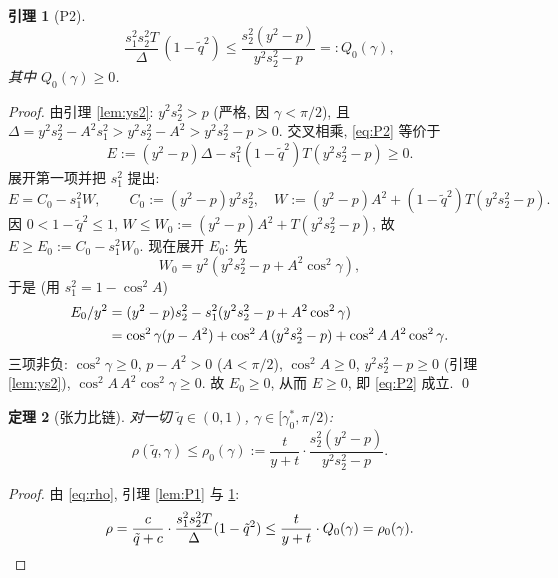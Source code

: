 \documentclass[UTF8]{ctexart}
\newtheorem{theorem}{定理}[section]
\newtheorem{lemma}[theorem]{引理}
\begin{document}
\begin{lemma}[P2]\label{lem:P2}
\begin{equation}
	\frac{s_1^2s_2^2T}{\Delta}\,(1-\tilde q^2)\le
	\frac{s_2^2(y^2-p)}{y^2s_2^2-p}=:Q_0(\gamma),
	\label{eq:P2}
\end{equation}
其中 $Q_0(\gamma)\ge0$.
\end{lemma}

\begin{proof}
由引理 \ref{lem:ys2}: $y^2s_2^2>p$ (严格, 因 $\gamma<\pi/2$), 且
$\Delta=y^2s_2^2-A^2s_1^2>y^2s_2^2-A^2>y^2s_2^2-p>0$. 交叉相乘, \eqref{eq:P2}
等价于
\begin{equation}
	E:=(y^2-p)\Delta-s_1^2(1-\tilde q^2)T(y^2s_2^2-p)\ge0.
	\label{eq:E}
\end{equation}
展开第一项并把 $s_1^2$ 提出:
\begin{equation}
	E=C_0-s_1^2W,
	\qquad
	C_0:=(y^2-p)y^2s_2^2,\quad
	W:=(y^2-p)A^2+(1-\tilde q^2)T(y^2s_2^2-p).
\end{equation}
因 $0<1-\tilde q^2\le1$, $W\le W_0:=(y^2-p)A^2+T(y^2s_2^2-p)$, 故
$E\ge E_0:=C_0-s_1^2W_0$. 现在展开 $E_0$: 先
\begin{equation*}
	W_0=y^2(y^2s_2^2-p+A^2\cos^2\gamma),
\end{equation*}
于是 (用 $s_1^2=1-\cos^2A$)
\begin{align}
	E_0/y^2&=(y^2-p)s_2^2-s_1^2(y^2s_2^2-p+A^2\cos^2\gamma)
	\notag\\
	&=\cos^2\gamma(p-A^2)+\cos^2A\,(y^2s_2^2-p)
	+\cos^2A\,A^2\cos^2\gamma.
	\label{eq:E0}
\end{align}
三项非负: $\cos^2\gamma\ge0$, $p-A^2>0$ ($A<\pi/2$), $\cos^2A\ge0$,
$y^2s_2^2-p\ge0$ (引理 \ref{lem:ys2}), $\cos^2A\,A^2\cos^2\gamma\ge0$.
故 $E_0\ge0$, 从而 $E\ge0$, 即 \eqref{eq:P2} 成立. \qed
\end{proof}

\begin{theorem}[张力比链]\label{thm:chain}
对一切 $\tilde q\in(0,1)$, $\gamma\in[\gamma_0^*,\pi/2)$:
\begin{equation}
	\rho(\tilde q,\gamma)\le\rho_0(\gamma):=
	\frac{t}{y+t}\cdot\frac{s_2^2(y^2-p)}{y^2s_2^2-p}.
	\label{eq:rho0}
\end{equation}
\end{theorem}

\begin{proof}
由 \eqref{eq:rho}, 引理 \ref{lem:P1} 与 \ref{lem:P2}:
\begin{equation*}
	\rho=\frac{c}{\tilde q+c}\cdot\frac{s_1^2s_2^2T}{\Delta}(1-\tilde q^2)
	\le\frac{t}{y+t}\cdot Q_0(\gamma)=\rho_0(\gamma).
	\qedhere
\end{equation*}
\end{proof}
\end{document}
